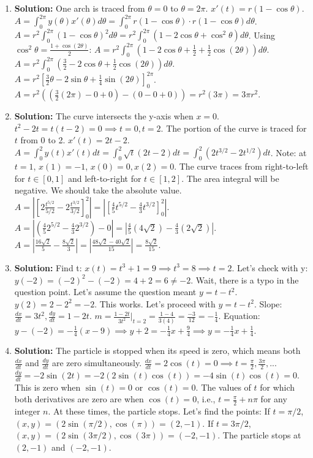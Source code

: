 \documentclass{article}
\begin{document}
\begin{enumerate}
\item \textbf{Solution:} One arch is traced from $\theta=0$ to $\theta=2\pi$.
$x'(t) = r(1-\cos\theta)$.
$A = \int_0^{2\pi} y(\theta)x'(\theta) d\theta = \int_0^{2\pi} r(1-\cos\theta) \cdot r(1-\cos\theta) d\theta$.
$A = r^2 \int_0^{2\pi} (1-\cos\theta)^2 d\theta = r^2 \int_0^{2\pi} (1 - 2\cos\theta + \cos^2\theta) d\theta$.
Using $\cos^2\theta = \frac{1+\cos(2\theta)}{2}$:
$A = r^2 \int_0^{2\pi} (1 - 2\cos\theta + \frac{1}{2} + \frac{1}{2}\cos(2\theta)) d\theta$.
$A = r^2 \int_0^{2\pi} (\frac{3}{2} - 2\cos\theta + \frac{1}{2}\cos(2\theta)) d\theta$.
$A = r^2 \left[ \frac{3}{2}\theta - 2\sin\theta + \frac{1}{4}\sin(2\theta) \right]_0^{2\pi}$.
$A = r^2 ((\frac{3}{2}(2\pi) - 0 + 0) - (0 - 0 + 0)) = r^2(3\pi) = 3\pi r^2$.

\item \textbf{Solution:} The curve intersects the y-axis when $x=0$.
$t^2 - 2t = t(t-2) = 0 \implies t=0, t=2$.
The portion of the curve is traced for $t$ from 0 to 2.
$x'(t) = 2t-2$.
$A = \int_{0}^{2} y(t)x'(t) dt = \int_{0}^{2} \sqrt{t}(2t-2) dt = \int_{0}^{2} (2t^{3/2} - 2t^{1/2}) dt$.
Note: at $t=1$, $x(1)=-1$, $x(0)=0, x(2)=0$. The curve traces from right-to-left for $t \in [0,1]$ and left-to-right for $t \in [1,2]$. The area integral will be negative. We should take the absolute value.
$A = \left| \left[ 2\frac{t^{5/2}}{5/2} - 2\frac{t^{3/2}}{3/2} \right]_0^2 \right| = \left| \left[ \frac{4}{5}t^{5/2} - \frac{4}{3}t^{3/2} \right]_0^2 \right|$.
$A = \left| (\frac{4}{5}2^{5/2} - \frac{4}{3}2^{3/2}) - 0 \right| = \left| \frac{4}{5}(4\sqrt{2}) - \frac{4}{3}(2\sqrt{2}) \right|$.
$A = \left| \frac{16\sqrt{2}}{5} - \frac{8\sqrt{2}}{3} \right| = \left| \frac{48\sqrt{2} - 40\sqrt{2}}{15} \right| = \frac{8\sqrt{2}}{15}$.

\item \textbf{Solution:} Find t: $x(t) = t^3+1 = 9 \implies t^3=8 \implies t=2$.
Let's check with y: $y(-2) = (-2)^2 - (-2) = 4+2=6 \neq -2$. Wait, there is a typo in the question point. Let's assume the question meant $y=t-t^2$.
$y(2)=2-2^2 = -2$. This works. Let's proceed with $y=t-t^2$.
Slope: $\frac{dx}{dt}=3t^2, \frac{dy}{dt}=1-2t$.
$m = \frac{1-2t}{3t^2}|_{t=2} = \frac{1-4}{3(4)} = \frac{-3}{12} = -\frac{1}{4}$.
Equation: $y - (-2) = -\frac{1}{4}(x-9) \implies y+2 = -\frac{1}{4}x+\frac{9}{4} \implies y = -\frac{1}{4}x + \frac{1}{4}$.

\item \textbf{Solution:} The particle is stopped when its speed is zero, which means both $\frac{dx}{dt}$ and $\frac{dy}{dt}$ are zero simultaneously.
$\frac{dx}{dt} = 2\cos(t) = 0 \implies t = \frac{\pi}{2}, \frac{3\pi}{2}, ...$
$\frac{dy}{dt} = -2\sin(2t) = -2(2\sin(t)\cos(t)) = -4\sin(t)\cos(t) = 0$.
This is zero when $\sin(t)=0$ or $\cos(t)=0$.
The values of $t$ for which both derivatives are zero are when $\cos(t)=0$, i.e., $t = \frac{\pi}{2} + n\pi$ for any integer $n$.
At these times, the particle stops. Let's find the points:
If $t=\pi/2$, $(x,y) = (2\sin(\pi/2), \cos(\pi)) = (2, -1)$.
If $t=3\pi/2$, $(x,y) = (2\sin(3\pi/2), \cos(3\pi)) = (-2, -1)$.
The particle stops at $(2, -1)$ and $(-2, -1)$.


\end{enumerate}
\end{document}
